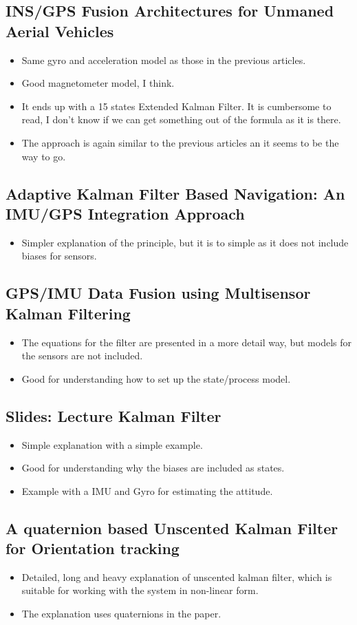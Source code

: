 \subsection{INS/GPS Fusion Architectures for Unmaned Aerial Vehicles}
\begin{itemize}
	\item Same gyro and acceleration model as those in the previous articles.
	\item Good magnetometer model, I think.
	\item It ends up with a 15 states Extended Kalman Filter. It is cumbersome to read, I don't know if we can get something out of the formula as it is there.
	\item The approach is again similar to the previous articles an it seems to be the way to go.
\end{itemize}
\subsection{Adaptive Kalman Filter Based Navigation: An IMU/GPS Integration Approach}
\begin{itemize}
	\item Simpler explanation of the principle, but it is to simple as it does not include biases for sensors.
\end{itemize}
\subsection{GPS/IMU Data Fusion using Multisensor Kalman Filtering}
\begin{itemize}
	\item The equations for the filter are presented in a more detail way, but models for the sensors are not included.
	\item Good for understanding how to set up the state/process model.
\end{itemize}
\subsection{Slides: Lecture Kalman Filter}
\begin{itemize}
	\item Simple explanation with a simple example. 
	\item Good for understanding why the biases are included as states.
	\item Example with a IMU and Gyro for estimating the attitude.
\end{itemize}
\subsection{A quaternion based Unscented Kalman Filter for Orientation tracking}
\begin{itemize}
	\item Detailed, long and heavy explanation of unscented kalman filter, which is suitable for working with the system in non-linear form. 
	\item The explanation uses quaternions in the paper.
\end{itemize}
